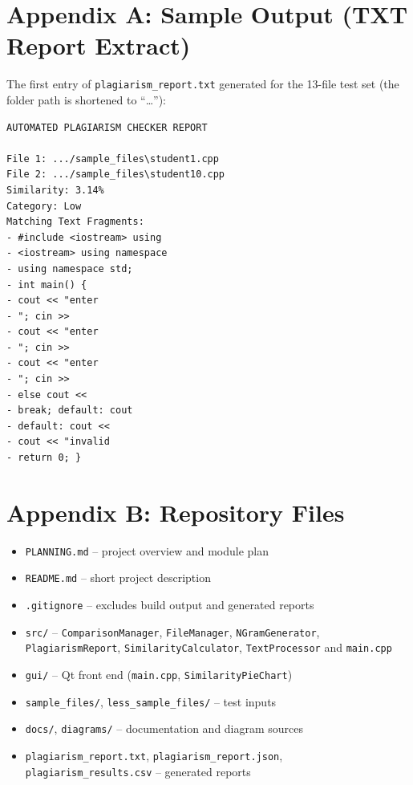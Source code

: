 \documentclass[12pt,a4paper,oneside]{book}
\begin{document}
\section*{Appendix A: Sample Output (TXT Report Extract)}
The first entry of \texttt{plagiarism\_report.txt} generated for the 13-file test set (the folder path is shortened to ``\ldots''):
\begin{lstlisting}[language={}, numbers=none, frame=none, xleftmargin=0pt]
AUTOMATED PLAGIARISM CHECKER REPORT

File 1: .../sample_files\student1.cpp
File 2: .../sample_files\student10.cpp
Similarity: 3.14%
Category: Low
Matching Text Fragments:
- #include <iostream> using
- <iostream> using namespace
- using namespace std;
- int main() {
- cout << "enter
- "; cin >>
- cout << "enter
- "; cin >>
- cout << "enter
- "; cin >>
- else cout <<
- break; default: cout
- default: cout <<
- cout << "invalid
- return 0; }
\end{lstlisting}

\section*{Appendix B: Repository Files}
\begin{itemize}
  \item \texttt{PLANNING.md} -- project overview and module plan
  \item \texttt{README.md} -- short project description
  \item \texttt{.gitignore} -- excludes build output and generated reports
  \item \texttt{src/} -- \texttt{ComparisonManager}, \texttt{FileManager}, \texttt{NGramGenerator}, \texttt{PlagiarismReport}, \texttt{SimilarityCalculator}, \texttt{TextProcessor} and \texttt{main.cpp}
  \item \texttt{gui/} -- Qt front end (\texttt{main.cpp}, \texttt{SimilarityPieChart})
  \item \texttt{sample\_files/}, \texttt{less\_sample\_files/} -- test inputs
  \item \texttt{docs/}, \texttt{diagrams/} -- documentation and diagram sources
  \item \texttt{plagiarism\_report.txt}, \texttt{plagiarism\_report.json}, \texttt{plagiarism\_results.csv} -- generated reports
\end{itemize}
\end{document}
